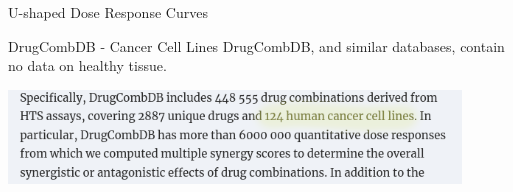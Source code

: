 \documentclass{beamer}
\begin{document}
\begin{frame}{U-shaped Dose Response Curves}
    \centering
\end{frame}


\begin{frame}{DrugCombDB - Cancer Cell Lines}
    DrugCombDB, and similar databases, contain no data on healthy tissue.
    \begin{center}
        \includegraphics[width = 0.9\textwidth]{figs/drug-comb-cancer-cells.png}
    \end{center}
\end{frame}
\end{document}
